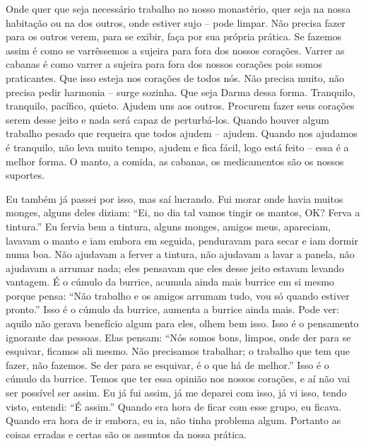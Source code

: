 Onde quer que seja necessário trabalho no nosso monastério, quer
seja na nossa habitação ou na dos outros, onde estiver sujo – pode
limpar. Não precisa fazer para os outros verem, para se exibir, faça
por sua própria prática. Se fazemos assim é como se varrêssemos a
sujeira para fora dos nossos corações. Varrer as cabanas é como varrer
a sujeira para fora dos nossos corações pois somos praticantes. Que
isso esteja nos corações de todos nós. Não precisa muito, não precisa
pedir harmonia – surge sozinha. Que seja Darma dessa forma. Tranquilo,
tranquilo, pacífico, quieto. Ajudem uns aos outros. Procurem fazer seus
corações serem desse jeito e nada será capaz de perturbá-los. Quando
houver algum trabalho pesado que requeira que todos ajudem – ajudem.
Quando nos ajudamos é tranquilo, não leva muito tempo, ajudem e fica
fácil, logo está feito – essa é a melhor forma. O manto, a comida, as
cabanas, os medicamentos são os nossos suportes.

Eu também já passei por isso, mas saí lucrando. Fui morar onde havia
muitos monges, alguns deles diziam: “Ei, no dia tal vamos tingir os
mantos, OK? Ferva a tintura.” Eu fervia bem a tintura, alguns monges,
amigos meus, apareciam, lavavam o manto e iam embora em seguida,
penduravam para secar e iam dormir numa boa. Não ajudavam a ferver a
tintura, não ajudavam a lavar a panela, não ajudavam a arrumar nada;
eles pensavam que eles desse jeito estavam levando vantagem. É o cúmulo
da burrice, acumula ainda mais burrice em si mesmo porque pensa: “Não
trabalho e os amigos arrumam tudo, vou só quando estiver pronto.” Isso
é o cúmulo da burrice, aumenta a burrice ainda mais. Pode ver: aquilo
não gerava benefício algum para eles, olhem bem isso. Isso é o
pensamento ignorante das pessoas. Elas pensam: “Nós somos bons, limpos,
onde der para se esquivar, ficamos ali mesmo. Não precisamos trabalhar;
o trabalho que tem que fazer, não fazemos. Se der para se esquivar, é o
que há de melhor.” Isso é o cúmulo da burrice. Temos que ter essa
opinião nos nossos corações, e aí não vai ser possível ser assim. Eu já
fui assim, já me deparei com isso, já vi isso, tendo visto, entendi: “É
assim.” Quando era hora de ficar com esse grupo, eu ficava. Quando era
hora de ir embora, eu ia, não tinha problema algum. Portanto as coisas
erradas e certas são os assuntos da nossa prática. 

